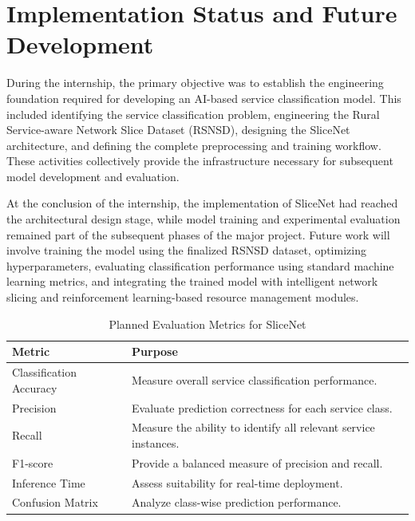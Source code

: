 \documentclass[12pt,a4paper]{report}
\begin{document}
	
	\section{Implementation Status and Future Development}
	\label{sec:implementation_status}
	
	During the internship, the primary objective was to establish the engineering foundation required for developing an AI-based service classification model. This included identifying the service classification problem, engineering the Rural Service-aware Network Slice Dataset (RSNSD), designing the SliceNet architecture, and defining the complete preprocessing and training workflow. These activities collectively provide the infrastructure necessary for subsequent model development and evaluation.
	
	At the conclusion of the internship, the implementation of SliceNet had reached the architectural design stage, while model training and experimental evaluation remained part of the subsequent phases of the major project. Future work will involve training the model using the finalized RSNSD dataset, optimizing hyperparameters, evaluating classification performance using standard machine learning metrics, and integrating the trained model with intelligent network slicing and reinforcement learning-based resource management modules.
	
	\begin{table}[H]
		\centering
		\caption{Planned Evaluation Metrics for SliceNet}
		\label{tab:evaluation_plan}
		
		\begin{tabular}{|p{5cm}|p{7cm}|}
			\hline
			
			\textbf{Metric} &
			\textbf{Purpose}
			\\
			\hline
			
			Classification Accuracy &
			Measure overall service classification performance.
			\\
			\hline
			
			Precision &
			Evaluate prediction correctness for each service class.
			\\
			\hline
			
			Recall &
			Measure the ability to identify all relevant service instances.
			\\
			\hline
			
			F1-score &
			Provide a balanced measure of precision and recall.
			\\
			\hline
			
			Inference Time &
			Assess suitability for real-time deployment.
			\\
			\hline
			
			Confusion Matrix &
			Analyze class-wise prediction performance.
			\\
			\hline
			
		\end{tabular}
		
	\end{table}
\end{document}

